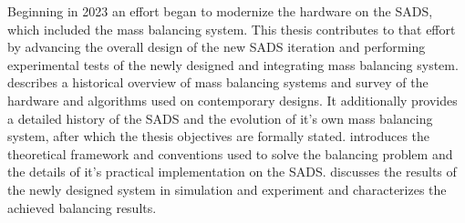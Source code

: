 Beginning in 2023 an effort began to modernize the hardware on the SADS, which included the mass balancing system. This thesis contributes to that effort by advancing the overall design of the new SADS iteration and performing experimental tests of the newly designed and integrating mass balancing system.  describes a historical overview of mass balancing systems and survey of the hardware and algorithms used on contemporary designs. It additionally provides a detailed history of the SADS and the evolution of it's own mass balancing system, after which the thesis objectives are formally stated.  introduces the theoretical framework and conventions used to solve the balancing problem and the details of it's practical implementation on the SADS.  discusses the results of the newly designed system in simulation and experiment and characterizes the achieved balancing results.









